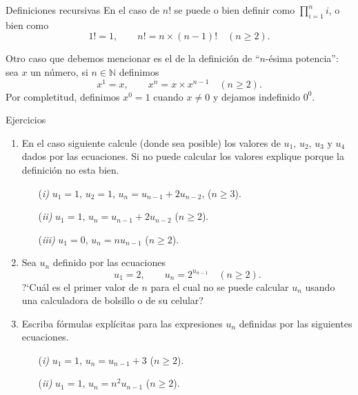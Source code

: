 \documentclass[11pt,spanish,makeidx]{amsbook}
\theoremstyle{definition}
\theoremstyle{remark}
\newcommand \NN{{\mathbb N}}
\begin{document}
\begin{section}{Definiciones recursivas}
En  el caso de $n!$ se puede  o bien definir como $\prod_{i=1}^{n} i$, o bien como
$$
1!=1,\qquad n!=n \times (n-1)! \quad (n\ge 2).
$$

Otro caso que debemos mencionar es  el de la definición de ``$n$-ésima potencia'': sea $x$ un  número, si $n \in \NN$ definimos
$$
x^1=x,\qquad x^n= x \times x^{n-1} \quad (n\ge 2).
$$
Por completitud,  definimos $x^0=1$ cuando $x \ne 0$ y  dejamos indefinido $0^0$. 


\begin{subsection}{Ejercicios}
\begin{enumerate}
\item En el caso siguiente calcule (donde sea posible) los valores de $u_1$, $u_2$, $u_3$ y $u_4$ dados por las ecuaciones. Si no puede calcular los valores explique porque la definición no esta bien.
\begin{enumerate}
\item[(\em i)] $u_1 = 1$, $u_2=1$, $u_n = u_{n-1} +2 u_{n-2}$, ($n \ge 3$). 
\item[(\em ii)] $u_1 = 1$, $u_n = u_{n-1} +2u_{n-2}$ ($n \ge 2$). 
\item[(\em iii)] $u_1 = 0$, $u_n = nu_{n-1}$ ($n \ge 2$).
\end{enumerate}
\item Sea $u_n$ definido por las ecuaciones
$$
u_1=2,\qquad u_n= 2^{u_{n-1}} \quad (n\ge 2).
$$
?`Cuál es el primer valor de $n$ para el cual no se puede calcular $u_n$ usando una calculadora de bolsillo o de su celular?
\item Escriba fórmulas explícitas para las expresiones $u_n$ definidas por las siguientes ecuaciones.
\begin{enumerate}
\item[(\em i)] $u_1 = 1$, $u_n = u_{n-1} +3$ ($n \ge 2$). 
\item[(\em ii)] $u_1 = 1$, $u_n = n^2u_{n-1}$ ($n \ge 2$).
\end{enumerate}
\end{enumerate}
\end{subsection}
\end{section}
\end{document}
